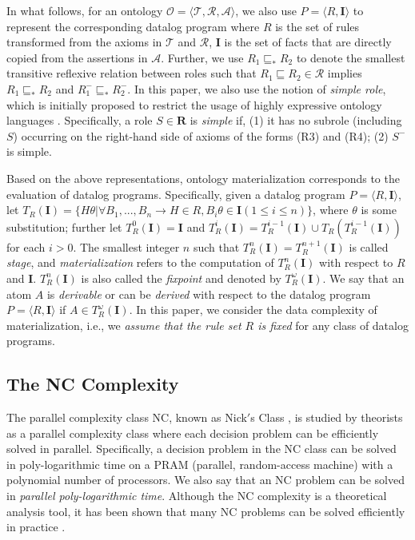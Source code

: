 In what follows, for an ontology $\mathcal{O}=\langle\mathcal{T},\mathcal{R},\mathcal{A}\rangle$,
we also use $P=\langle R, \textbf{I}\rangle$ to represent the corresponding datalog program
where $R$ is the set of rules transformed from the axioms in $\mathcal{T}$ and $\mathcal{R}$,
$\textbf{I}$ is the set of facts that are directly copied from the assertions in $\mathcal{A}$.
Further, we use $R_1\sqsubseteq_{*}R_2$ to denote the smallest transitive reflexive relation
between roles such that $R_1\sqsubseteq R_2\in\mathcal{R}$ implies $R_1\sqsubseteq_{*}R_2$
and $R_1^-\sqsubseteq_{*}R_2^-$. In this paper, we also use the
notion of \emph{simple role}, which is initially proposed to restrict the
usage of highly expressive ontology languages \cite{HorrocksS04}.
Specifically, a role $S\in\textbf{R}$ is \emph{simple} if, (1) it has no subrole (including $S$)
occurring on the right-hand side of axioms of the forms (R3) and (R4); (2) $S^-$ is simple.

Based on the above representations, ontology materialization
corresponds to the evaluation of datalog programs.
Specifically, given a datalog program $P=\langle R, \textbf{I}\rangle$,
let $T_R(\textbf{I})=\{H\theta|\forall B_1,...,B_n\rightarrow H\in R, B_i\theta\in\textbf{I} (1\leq i\leq n)\}$,
where $\theta$ is some substitution; further let $T_R^{0}(\textbf{I})=\textbf{I}$ and
 $T_R^{i}(\textbf{I})=T_R^{i-1}(\textbf{I})\cup T_R(T_R^{i-1}(\textbf{I}))$ for each $i>0$.
The smallest integer $n$ such that $T_R^{n}(\textbf{I})= T_R^{n+1}(\textbf{I})$ is called \emph{stage},
and \emph{materialization} refers to the computation of $T_R^{n}(\textbf{I})$ with respect to $R$ and \textbf{I}.
$T_R^{n}(\textbf{I})$ is also called the \emph{fixpoint} and denoted by $T_R^{\omega}(\textbf{I})$.
We say that an atom $A$ is \emph{derivable} or can be \emph{derived} with respect
to the datalog program $P=\langle R, \textbf{I}\rangle$ if $A\in T_R^{\omega}(\textbf{I})$.
In this paper, we consider the data complexity of materialization, i.e., we \emph{assume that the rule set $R$ is fixed}
for any class of datalog programs.


\subsection{The NC Complexity}

The parallel complexity class NC, known as Nick$'$s
Class \cite{Raymond95}, is studied by theorists as a parallel complexity class
where each decision problem can be efficiently solved in parallel.
Specifically, a decision problem in the NC class
can be solved in poly-logarithmic time on a PRAM (parallel, random-access machine) with
a polynomial number of processors. We also say that an NC problem can be solved
in \emph{parallel poly-logarithmic time}.
Although the NC complexity is a theoretical analysis tool,
it has been shown that many NC problems can be solved efficiently in practice \cite{Raymond95}.

